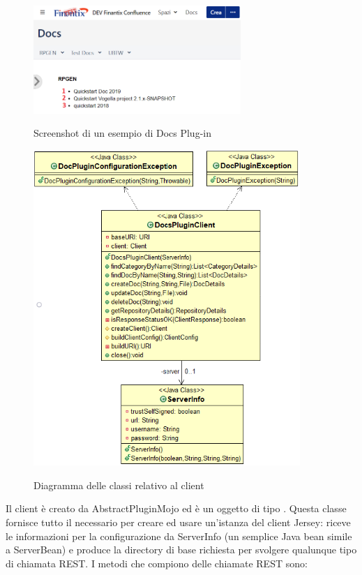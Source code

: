 	\begin{figure}[H]
		\centering
		\includegraphics[width=0.7\textwidth]{immagini/DocsExamples.png}\\
		\caption{Screenshot di un esempio di Docs Plug-in}
	\end{figure}




\begin{figure}[H]
    \centering
    \includegraphics[width=0.9\textwidth]{immagini/client.png}\\
    \caption{Diagramma delle classi relativo al client}
\end{figure}

Il client è creato da AbstractPluginMojo ed è un oggetto di tipo .
Questa classe fornisce tutto il necessario per creare ed usare un'istanza del client Jersey: riceve le informazioni per la configurazione da ServerInfo (un semplice Java bean simile a ServerBean) e produce la directory di base richiesta per svolgere qualunque tipo di chiamata REST.
I metodi che compiono delle chiamate REST sono:

